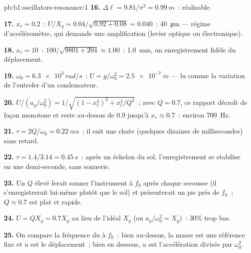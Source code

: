 \begin{solution}{pb:b1:oscillators-resonance:1}
\textbf{16.} $\Delta\ell = 9.81/\pi^2 = \qty{0.99}{m}$~: réalisable.

\textbf{17.} $x_r = 0.2$~: $U/X_g = 0.04/\sqrt{0.92 + 0.08} = 0.040$~:
\qty{40}{\micro m} --- régime d'accéléromètre, qui demande une
amplification (levier optique ou électronique).

\textbf{18.} $x_r = 10$~: $100/\sqrt{9801 + 204} \approx 1.00$~: \qty{1.0}{mm},
un enregistrement fidèle du déplacement.

\textbf{19.} $\omega_0 = \qty{6.3e3}{rad/s}$~: $U = g/\omega_0^2 = \qty{2.5e-7}{m}$
--- lu comme la variation de l'entrefer d'un condensateur.

\textbf{20.} $U/(a_g/\omega_0^2) = 1/\sqrt{(1 - x_r^2)^2 + x_r^2/Q^2}$~; avec
$Q = 0.7$, ce rapport décroît de façon monotone et reste au-dessus de
$0.9$ jusqu'à $x_r \approx 0.7$~: environ \qty{700}{Hz}.

\textbf{21.} $\tau = 2Q/\omega_0 = \qty{0.22}{ms}$~: il suit une chute
(quelques dizaines de millisecondes) sans retard.

\textbf{22.} $\tau = 1.4/3.14 = \qty{0.45}{s}$~: après un échelon du sol,
l'enregistrement se stabilise en une demi-seconde, sans sonnerie.

\textbf{23.} Un $Q$ élevé ferait sonner l'instrument à $f_0$ après chaque
secousse (il s'enregistrerait lui-même plutôt que le sol) et
présenterait un pic près de $f_0$~; $Q \approx 0.7$ est plat et rapide.

\textbf{24.} $U = QX_g = 0.7X_g$ au lieu de l'idéal $X_g$ (ou $a_g/\omega_0^2
= X_g$)~: $30\%$ trop bas.

\textbf{25.} On compare la fréquence du  à $f_0$~: bien au-dessus,
la masse est une référence fixe et $u$ est le déplacement~; bien en
dessous, $u$ est l'accélération divisée par $\omega_0^2$.
\end{solution}

